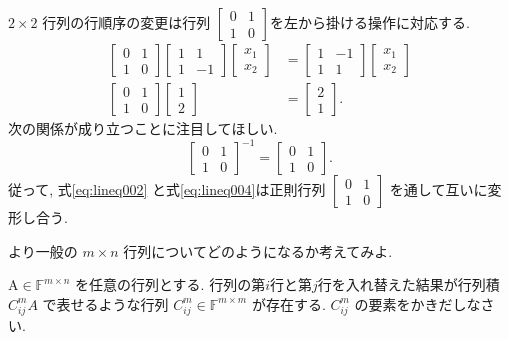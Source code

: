 \documentclass[a4paper]{scrbook}
\theoremstyle{definition}
\let\BeginKnitrBlock\begin \let\EndKnitrBlock\end
\begin{document}
\(2\times2\) 行列の行順序の変更は行列
\(\left[\begin{smallmatrix}0 & 1\\ 1 & 0 \end{smallmatrix}\right]\)を左から掛ける操作に対応する.
\[
\begin{aligned}
\begin{bmatrix}0 & 1\\
1 & 0
\end{bmatrix}\begin{bmatrix}1 & 1\\
1 & -1
\end{bmatrix}\begin{bmatrix}x_{1}\\
x_{2}
\end{bmatrix} & =\begin{bmatrix}1 & -1\\
1 & 1
\end{bmatrix}\begin{bmatrix}x_{1}\\
x_{2}
\end{bmatrix}\\
\begin{bmatrix}0 & 1\\
1 & 0
\end{bmatrix}\begin{bmatrix}1\\
2
\end{bmatrix} & =\begin{bmatrix}2\\
1
\end{bmatrix}.
\end{aligned}
\] 次の関係が成り立つことに注目してほしい. \[
\begin{bmatrix}
  0 & 1\\
  1 & 0 
\end{bmatrix}^{-1}
=
\begin{bmatrix}
  0 & 1\\
  1 & 0
\end{bmatrix}.
\] 従って, 式\eqref{eq:lineq002} と式\eqref{eq:lineq004}は正則行列
\(\left[\begin{smallmatrix}0 & 1\\ 1 & 0 \end{smallmatrix}\right]\)
を通して互いに変形し合う.

より一般の \(m\times n\) 行列についてどのようになるか考えてみよ.

\BeginKnitrBlock{exercise}
A\(\in\mathbb{F}^{m\times n}\) を任意の行列とする.
行列の第\(i\)行と第\(j\)行を入れ替えた結果が行列積 \(C_{ij}^{m}A\)
で表せるような行列 \(C_{ij}^{m}\in\mathbb{F}^{m\times m}\) が存在する.
\(C_{ij}^{m}\) の要素をかきだしなさい.
\EndKnitrBlock{exercise}
\end{document}
